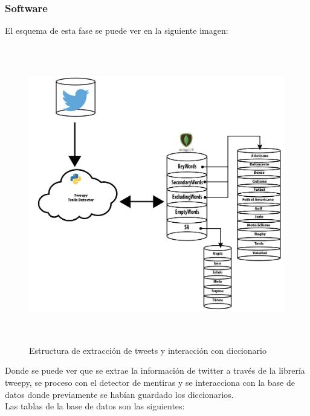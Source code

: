 \documentclass[../all.tex]{subfiles}
\begin{document}
    \subsubsection{Software}
        El esquema de esta fase se puede ver en la siguiente imagen:\\
        \begin{figure}[H]
        \centering
            \includegraphics[height=13cm, width=15cm]{imgs/extraccionTwitter.png}
            \caption{Estructura de extracción de tweets y interacción con diccionario}
        \end{figure}
        Donde se puede ver que se extrae la información de twitter a través de la librería tweepy, se proceso con el detector de mentiras y se interacciona con la base de datos donde previamente se habían guardado los diccionarios.\\
        Las tablas de la base de datos son las siguientes:
\end{document}

